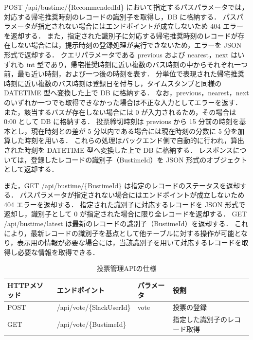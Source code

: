 POST /api/bustime/\{RecommendedId\} において指定するパスパラメータでは，対応する帰宅推奨時刻のレコードの識別子を取得し，DB に格納する．
パスパラメータが指定されない場合にはエンドポイントが成立しないため 404 エラーを返却する．
また，指定された識別子に対応する帰宅推奨時刻のレコードが存在しない場合には，提示時刻の登録処理が実行できないため，エラーを JSON 形式で返却する．
クエリパラメータである previous および nearest，next はいずれも int 型であり，帰宅推奨時刻に近い複数のバス時刻の中からそれぞれ一つ前，最も近い時刻，および一つ後の時刻を表す．
分単位で表現された帰宅推奨時刻に近い複数のバス時刻は登録日を付与し，タイムスタンプと同様の DATETIME 型へ変換した上で DB に格納する．
なお，previous，nearest，next のいずれか一つでも取得できなかった場合は不正な入力としてエラーを返す．
また，該当するバスが存在しない場合には 0 が入力されるため，その場合は 0:00 として DB に格納する．
投票締切時刻は previous から 15 分前の時刻を基本とし，現在時刻との差が 5 分以内である場合には現在時刻の分数に 5 分を加算した時刻を用いる．
これらの処理はバックエンド側で自動的に行われ，算出された時刻を DATETIME 型へ変換した上で DB に格納する．
レスポンスについては，登録したレコードの識別子（BustimeId）を JSON 形式のオブジェクトとして返却する．


また，GET /api/bustime/\{BustimeId\} は指定のレコードのステータスを返却する．
パスパラメータが指定されない場合にはエンドポイントが成立しないため 404 エラーを返却する．
指定された識別子に対応するレコードを JSON 形式で返却し，識別子として 0 が指定された場合に限り全レコードを返却する．
GET /api/bustime/latest は最新のレコードの識別子（BustimeId）を返却する．
これにより，最新レコードの識別子を基点として他テーブルに対する操作が可能となり，表示用の情報が必要な場合には，当該識別子を用いて対応するレコードを取得し必要な情報を取得できる．


\begin{table}[htb]
  \captionsetup[table]{justification=centering}
  \centering
  \caption{投票管理APIの仕様}
  \label{tab:voteAPI}
  \begin{tabular}{|
    >{\centering\arraybackslash}m{1.5cm}|
    >{\raggedright\arraybackslash}m{6cm}|
    >{\centering\arraybackslash}m{2cm}|
    >{\centering\arraybackslash}m{3cm}|}
    \hline
    \textbf{HTTPメソッド} & \textbf{エンドポイント}          & \textbf{パラメータ} & \textbf{役割} \\
    \hline
    POST
                      & /api/vote/\{SlackUserId\}
                      & vote
                      & 投票の登録                                                    \\
    \hline
    GET
                      & /api/vote/\{BustimeId\}
                      &
                      & 指定した識別子のレコード取得                                           \\
    \hline
  \end{tabular}
\end{table}

